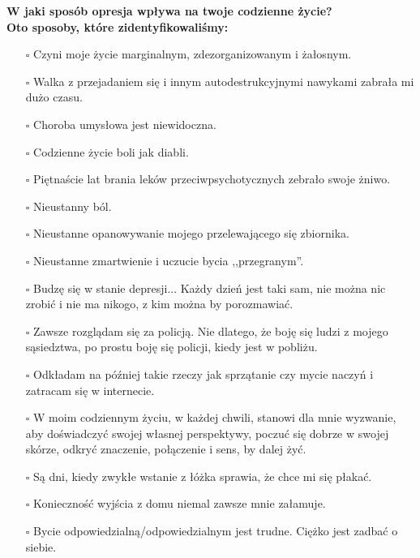 \noindent\textcolor{ProcessBlue}{\textbf{\Large{W jaki sposób opresja wpływa na twoje codzienne życie?}}}\\
\textbf{\large{Oto sposoby, które zidentyfikowaliśmy:}}
\begin{multicols}{2}
\begin{itemize}
\item[$\square$]{Czyni moje życie marginalnym, zdezorganizowanym i żałosnym.}
\item[$\square$]{Walka z przejadaniem się i innym autodestrukcyjnymi nawykami zabrała mi dużo czasu.}
\item[$\square$]{Choroba umysłowa jest niewidoczna.}
\item[$\square$]{Codzienne życie boli jak diabli.}
\item[$\square$]{Piętnaście lat brania leków przeciwpsychotycznych zebrało swoje żniwo.}
\item[$\square$]{Nieustanny ból.}
\item[$\square$]{Nieustanne opanowywanie mojego przelewającego się zbiornika.}
\item[$\square$]{Nieustanne zmartwienie i uczucie bycia ,,przegranym''.}
\item[$\square$]{Budzę się w stanie depresji... Każdy dzień jest taki sam, nie można nic zrobić i nie ma nikogo, z kim można by porozmawiać.}
\item[$\square$]{Zawsze rozglądam się za policją. Nie dlatego, że boję się ludzi z mojego sąsiedztwa, po prostu boję się policji, kiedy jest w pobliżu.}
\item[$\square$]{Odkładam na później takie rzeczy jak sprzątanie czy mycie naczyń i zatracam się w internecie.}
\item[$\square$]{W moim codziennym życiu, w każdej chwili, stanowi dla mnie wyzwanie, aby doświadczyć swojej własnej perspektywy, poczuć się dobrze w swojej skórze, odkryć znaczenie, połączenie i sens, by dalej żyć.}
\item[$\square$]{Są dni, kiedy zwykłe wstanie z łóżka sprawia, że chce mi się płakać.}
\item[$\square$]{Konieczność wyjścia z domu niemal zawsze mnie załamuje.}
\item[$\square$]{Bycie odpowiedzialną/odpowiedzialnym jest trudne. Ciężko jest zadbać o siebie.}
\end{itemize}
\end{multicols}


